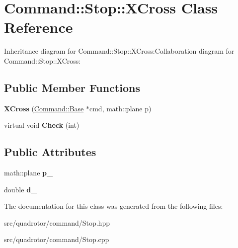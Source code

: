 \hypertarget{classCommand_1_1Stop_1_1XCross}{
\section{Command::Stop::XCross Class Reference}
\label{classCommand_1_1Stop_1_1XCross}
}
Inheritance diagram for Command::Stop::XCross:Collaboration diagram for Command::Stop::XCross:\subsection*{Public Member Functions}
\begin{DoxyCompactItemize}
\item 
\hypertarget{classCommand_1_1Stop_1_1XCross_a9019aea486d803956c223ffca0df2a4c}{
{\bfseries XCross} (\hyperlink{classCommand_1_1Base}{Command::Base} $\ast$cmd, math::plane p)}
\label{classCommand_1_1Stop_1_1XCross_a9019aea486d803956c223ffca0df2a4c}

\item 
\hypertarget{classCommand_1_1Stop_1_1XCross_afd4251c9153c934f2c8c194f92a5dcdb}{
virtual void {\bfseries Check} (int)}
\label{classCommand_1_1Stop_1_1XCross_afd4251c9153c934f2c8c194f92a5dcdb}

\end{DoxyCompactItemize}
\subsection*{Public Attributes}
\begin{DoxyCompactItemize}
\item 
\hypertarget{classCommand_1_1Stop_1_1XCross_aa726f4a4450affa991bbdc6650876666}{
math::plane {\bfseries p\_\-}}
\label{classCommand_1_1Stop_1_1XCross_aa726f4a4450affa991bbdc6650876666}

\item 
\hypertarget{classCommand_1_1Stop_1_1XCross_a42e2e27b8d4401a205c2267a34765e89}{
double {\bfseries d\_\-}}
\label{classCommand_1_1Stop_1_1XCross_a42e2e27b8d4401a205c2267a34765e89}

\end{DoxyCompactItemize}


The documentation for this class was generated from the following files:\begin{DoxyCompactItemize}
\item 
src/quadrotor/command/Stop.hpp\item 
src/quadrotor/command/Stop.cpp\end{DoxyCompactItemize}

